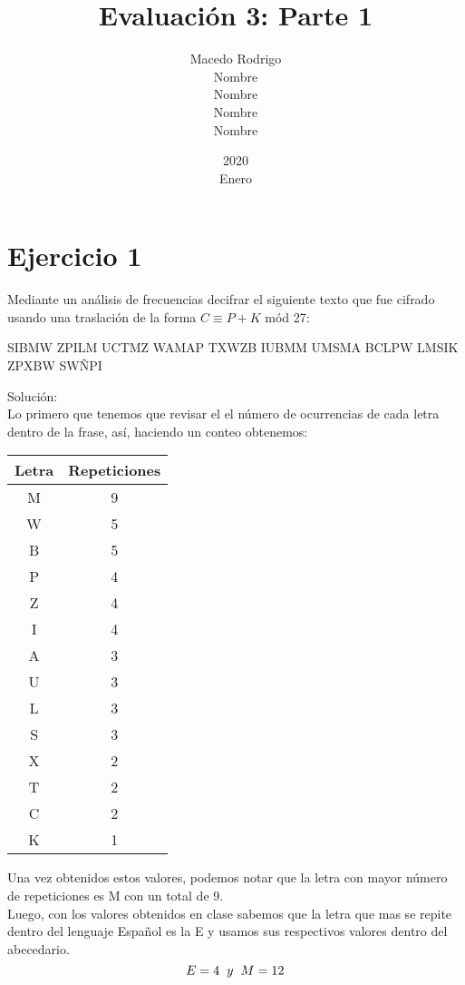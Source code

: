 \documentclass[12pt]{article}
\title{Evaluación 3: Parte 1}
\date{2020 \\ Enero}
\author{Macedo Rodrigo \\Nombre \\ Nombre \\ Nombre \\ Nombre}
\begin{document}
\maketitle
\section{Ejercicio 1}
\par Mediante un análisis de frecuencias decifrar el siguiente texto que fue cifrado usando una traslación de la forma $C \equiv P + K$  mód 27: 
\begin{center}
    SIBMW ZPILM UCTMZ WAMAP TXWZB IUBMM UMSMA BCLPW LMSIK ZPXBW SWÑPI
\end{center}

\par Solución: \\
Lo primero que tenemos que revisar el el número de ocurrencias de cada letra dentro de la frase, así, haciendo un conteo obtenemos: 

\begin{center}
    \begin{tabular}{ |c|c|}
        \hline
            Letra & Repeticiones \\
        \hline
        M & 9 \\
        W & 5 \\
        B & 5 \\
        P & 4 \\
        Z & 4 \\
        I & 4 \\
        A & 3 \\
        U & 3 \\
        L & 3 \\
        S & 3 \\
        X & 2 \\ 
        T & 2 \\ 
        C & 2 \\ 
        K & 1 \\
        \hline
    \end{tabular}
\end{center}

Una vez obtenidos estos valores, podemos notar que la letra con mayor número de repeticiones es M con un total de 9. \\
Luego, con los valores obtenidos en clase sabemos que la letra que mas se repite dentro del lenguaje Español es la E y usamos sus respectivos valores dentro del abecedario.
\begin{equation}
    E = 4 \hspace{0.2cm} y \hspace{0.2cm} M = 12
\end{equation}
\end{document}
